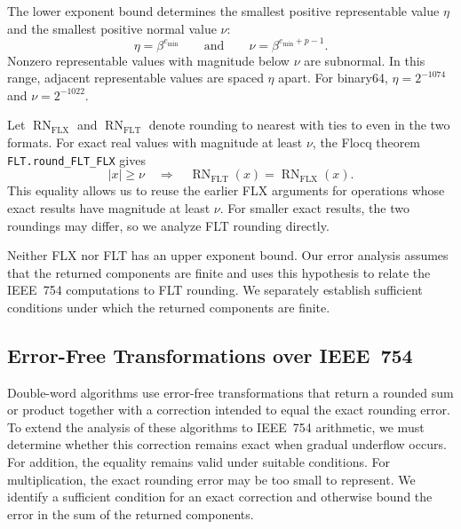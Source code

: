 The lower exponent bound determines the smallest positive
representable value $\eta$ and the smallest positive normal value $\nu$:
\begin{equation}
  \eta=\beta^{e_{\min}}
  \qquad\text{and}\qquad
  \nu=\beta^{e_{\min}+p-1}.
  \label{eq:flt-thresholds}
\end{equation}
Nonzero representable values with magnitude below $\nu$ are
subnormal. In this range, adjacent representable values are spaced
$\eta$ apart. For binary64, $\eta=2^{-1074}$ and $\nu=2^{-1022}$.

Let $\operatorname{RN}_{\mathrm{FLX}}$ and
$\operatorname{RN}_{\mathrm{FLT}}$ denote rounding to nearest with
ties to even in the two formats. For exact real values with
magnitude at least $\nu$, the Flocq theorem
\texttt{FLT.round\_FLT\_FLX} gives
\begin{equation}
  |x|\geq\nu
  \quad\Longrightarrow\quad
  \operatorname{RN}_{\mathrm{FLT}}(x)
    =\operatorname{RN}_{\mathrm{FLX}}(x).
  \label{eq:round-flt-flx}
\end{equation}
This equality allows us to reuse the earlier FLX arguments for
operations whose exact results have magnitude at least $\nu$.
For smaller exact results, the two roundings may differ, so we
analyze FLT rounding directly.

Neither FLX nor FLT has an upper exponent bound. Our error analysis
assumes that the returned components are finite and uses this
hypothesis to relate the IEEE~754 computations to FLT rounding.
We separately establish sufficient conditions under which the
returned components are finite.

\subsection{Error-Free Transformations over IEEE~754}
\label{sec:error-free-transformations}

Double-word algorithms use error-free transformations that return
a rounded sum or product together with a correction intended to
equal the exact rounding error. To extend the analysis of these
algorithms to IEEE~754 arithmetic, we must determine whether this
correction remains exact when gradual underflow occurs. For
addition, the equality remains valid under suitable conditions.
For multiplication, the exact rounding error may be too small to
represent. We identify a sufficient condition for an exact correction
and otherwise bound the error in the sum of the returned components.

